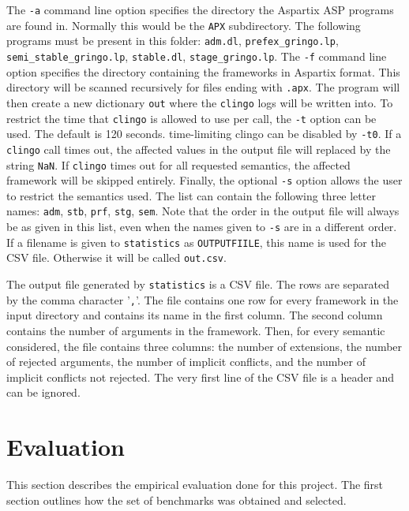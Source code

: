 \documentclass[parskip=half]{scrartcl}
\begin{document}
The \texttt{-a} command line option specifies the directory the Aspartix ASP
programs are found in. Normally this would be the \texttt{APX\/} subdirectory.
The following programs must be present in this folder: \texttt{adm.dl},
\texttt{prefex\_gringo.lp}, \texttt{semi\_stable\_gringo.lp},
\texttt{stable.dl}, \texttt{stage\_gringo.lp}.  The \texttt{-f} command line
option specifies the directory containing the frameworks in Aspartix format.
This directory will be scanned recursively for files ending
with \texttt{.apx}. The program will then create a new
dictionary \texttt{out\/} where the \texttt{clingo} logs will be written into.
To restrict the time that \texttt{clingo} is allowed to use per call, the
\texttt{-t} option can be used. The default is 120 seconds. time-limiting
clingo can be disabled by \texttt{-t0}. If a \texttt{clingo} call times out, the
affected values in the output file will replaced by the string \texttt{NaN}.
If \texttt{clingo} times out for all requested semantics, the affected
framework will be skipped entirely.
Finally, the optional \texttt{-s} option allows the user to restrict the
semantics used. The list can contain the following three letter names:
\texttt{adm}, \texttt{stb}, \texttt{prf}, \texttt{stg}, \texttt{sem}. Note that
the order in the output file will always be as given in this list, even when the
names given to \texttt{-s} are in a different order. If a filename is given to
\texttt{statistics} as \texttt{OUTPUTFIILE}, this name is used for the CSV file.
Otherwise it will be called \texttt{out.csv}.

The output file generated by \texttt{statistics} is a CSV file. The rows are
separated by the comma character '\texttt{,}'. The file contains one row for
every framework in the input directory and contains its name in the first
column. The second column contains the number of arguments in the framework.
Then, for every semantic considered, the file contains three columns: the number
of extensions, the number of rejected arguments, the number of implicit
conflicts, and the number of implicit conflicts not rejected.  The very first
line of the CSV file is a header and can be ignored.

\section{Evaluation}
\label{evaluation}
This section describes the empirical evaluation done for this project.
The first section outlines how the set of benchmarks was obtained and selected.
\end{document}
